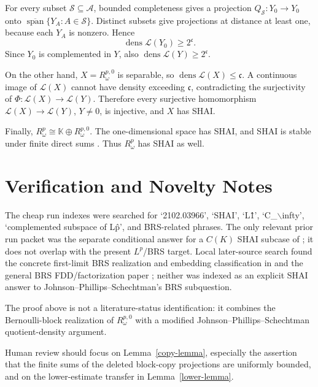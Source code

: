 \documentclass[11pt]{article}
\newcommand{\Lop}{\mathcal L}
\newcommand{\dens}{\operatorname{dens}}
\begin{document}
For every subset \(\mathcal S\subseteq\mathcal A\), bounded completeness gives
a projection \(Q_{\mathcal S}:Y_0\to Y_0\) onto
\(\overline{\operatorname{span}}\{Y_A:A\in\mathcal S\}\).  Distinct subsets
give projections at distance at least one, because each \(Y_A\) is nonzero.
Hence
\[
  \dens \Lop(Y_0)\ge 2^{\mathfrak c}.
\]
Since \(Y_0\) is complemented in \(Y\), also
\(\dens \Lop(Y)\ge 2^{\mathfrak c}\).

On the other hand, \(X=R_\omega^{p,0}\) is separable, so
\(\dens\Lop(X)\le\mathfrak c\).  A continuous image of \(\Lop(X)\) cannot have
density exceeding \(\mathfrak c\), contradicting the surjectivity of
\(\Phi:\Lop(X)\to\Lop(Y)\).  Therefore every surjective homomorphism
\(\Lop(X)\to\Lop(Y)\), \(Y\ne0\), is injective, and \(X\) has SHAI.

Finally, \(R_\omega^p\cong \mathbb K\oplus R_\omega^{p,0}\).  The
one-dimensional space has SHAI, and SHAI is stable under finite direct sums
\cite[Proposition 2.9]{Horvath}.  Thus \(R_\omega^p\) has SHAI as well.

\section*{Verification and Novelty Notes}

The cheap run indexes were searched for `2102.03966', `SHAI', `L\^1',
`C\_\(\backslash\)infty', `complemented subspace of L\^p', and BRS-related
phrases.  The only relevant prior run packet was the separate conditional
answer for a \(C(K)\) SHAI subcase of \cite{HK}; it does not overlap with the
present \(L^p\)/BRS target.  Local later-source search found the concrete
first-limit BRS realization and embedding classification in \cite{Sampedro}
and the general BRS FDD/factorization paper \cite{KM}; neither was indexed as
an explicit SHAI answer to Johnson--Phillips--Schechtman's BRS subquestion.

The proof above is not a literature-status identification: it combines the
Bernoulli-block realization of \(R_\omega^{p,0}\) with a modified
Johnson--Phillips--Schechtman quotient-density argument.

Human review should focus on Lemma~\ref{copy-lemma}, especially the assertion
that the finite sums of the deleted block-copy projections are uniformly
bounded, and on the lower-estimate transfer in Lemma~\ref{lower-lemma}.
\end{document}
